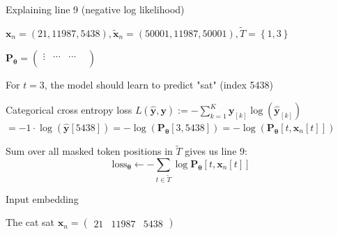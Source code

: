 \documentclass[12pt,aspectratio=169,handout]{beamer}
\begin{document}
\begin{frame}{Explaining line 9 (negative log likelihood)}
	
	\begin{small}
		$\bm{x}_n = (21, 11987, 5438), \bm{\tilde{x}}_n = (50001, 11987, 50001), \tilde{T} = \left\{ 1, 3 \right\}$
		
		$
		\bm{P_{\theta}} =
		\begin{pmatrix}
			\vdots &  \cdots &  \cdots &  \\
		\end{pmatrix}
		$
	\end{small}	
	
	For $t = 3$, the model should learn to predict "sat" (index 5438)
	
	\begin{block}{Categorical cross entropy loss}
		$L (\bm{\hat{y}, \bm{y}}) := - \sum_{k = 1}^{K} \bm{y}_{[k]} \log \left(  \bm{\hat{y}}_{[k]} \right)$ \\
		$= - 1 \cdot \log (\bm{\hat{y}}[5438])
		= - \log(\bm{P_{\theta}}[3, 5438])
		= - \log(\bm{P_{\theta}}[t, \bm{x}_n[t]])$	
	\end{block}
	

Sum over all masked token positions in $\tilde{T}$ gives us line 9:\\
$$\text{loss}_{\bm{\theta}} \gets - \sum_{t \in \tilde{T}} \log \bm{P_{\theta}} [t, \bm{x}_n[t]] $$
	
\end{frame}



\fi



\begin{frame}{Input embedding}

The cat sat $\bm{x}_n =
\begin{pmatrix}
	21 &
	11987 &
	5438
\end{pmatrix}$

\end{frame}	
\end{document}
